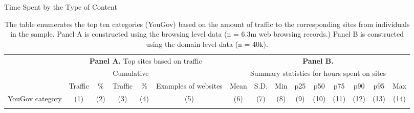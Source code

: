 \documentclass[12pt, letterpaper]{article}
\begin{document}
\begin{landscape}%
    \begin{table}[ht] \centering \normalsize \setlength\tabcolsep{3 pt} \setlength{\defaultaddspace}{0pt}
    \def\sym#1{\ifmmode^{#1}\else\(^{#1}\)\fi}
    \caption{Time Spent by the Type of Content}
    \label{tab:top10cat_description}
	\begin{adjustbox}{max width=1.325\textwidth}
            \begin{tabular}{@{\hspace{0\tabcolsep}}lrrrrrrrrrrrrrr@{\hspace{0\tabcolsep}}}
            \toprule\toprule
            &\multicolumn{5}{c}{\textbf{Panel A.} Top sites based on traffic}&\multicolumn{9}{c}{\textbf{Panel B.}}\\
            \cmidrule(lr){2-6}
            &&&\multicolumn{2}{c}{Cumulative}&&\multicolumn{9}{c}{Summary statistics for hours spent on sites}\\
            \cmidrule(l){4-5}\cmidrule{7-15}
            &\multicolumn{1}{c}{Traffic}&\multicolumn{1}{c}{\%}&\multicolumn{1}{c}{Traffic}&\multicolumn{1}{c}{\%}&\multicolumn{1}{c}{Examples of websites}&\multicolumn{1}{c}{Mean}&\multicolumn{1}{c}{S.D.}&\multicolumn{1}{c}{Min}&\multicolumn{1}{c}{p25}&\multicolumn{1}{c}{p50}&\multicolumn{1}{c}{p75}&\multicolumn{1}{c}{p90}&\multicolumn{1}{c}{p95}&\multicolumn{1}{c}{Max}\\
            \cmidrule(l){2-5}
            YouGov category&\multicolumn{1}{c}{(1)}&\multicolumn{1}{c}{(2)}&\multicolumn{1}{c}{(3)}&\multicolumn{1}{c}{(4)}&\multicolumn{1}{c}{(5)}&\multicolumn{1}{c}{(6)}&\multicolumn{1}{c}{(7)}&\multicolumn{1}{c}{(8)}&\multicolumn{1}{c}{(9)}&\multicolumn{1}{c}{(10)}&\multicolumn{1}{c}{(11)}&\multicolumn{1}{c}{(12)}&\multicolumn{1}{c}{(13)}&\multicolumn{1}{c}{(14)} \\
            \midrule
            \\       
            \bottomrule
        \end{tabular}
        \end{adjustbox}
        \caption*{\scriptsize
        The table enumerates the top ten categories (YouGov) based on the amount of traffic to the corresponding sites from individuals in the sample.
        Panel A is constructed using the browsing level data (n = 6.3m web browsing records.) Panel B is constructed using the domain-level data (n = 40k).
        }
    \end{table}
\end{landscape}
\end{document}
